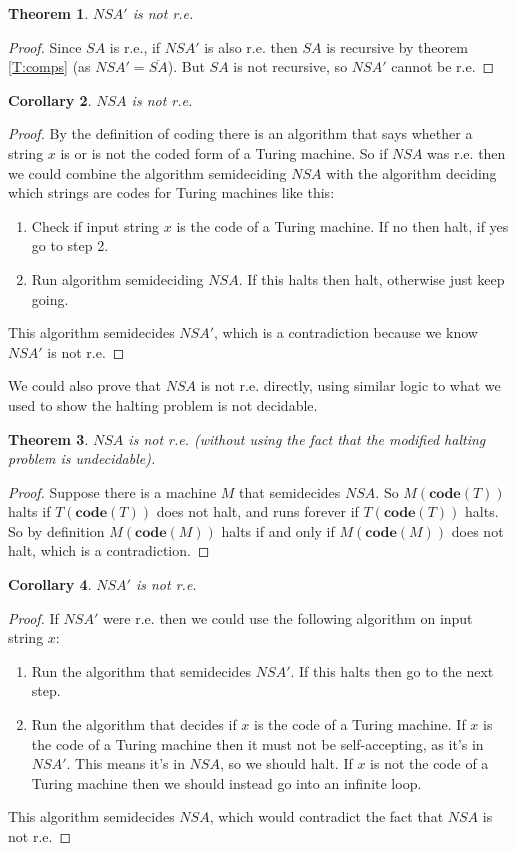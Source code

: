 \documentclass{article}
\theoremstyle{plain}
\newtheorem{theorem}{Theorem}[section]{\bfseries}{\itshape}
\newtheorem{corollary}[theorem]{Corollary}{\bfseries}{\upshape}
\theoremstyle{definition}
\newcommand{\co}{\mathbf{code}}
\begin{document}
\begin{theorem}
$NSA'$ is not r.e.
\end{theorem}
\begin{proof}
Since $SA$ is r.e., if $NSA'$ is also r.e. then $SA$ is recursive by theorem \ref{T:comps} (as $NSA'=\overline{SA}$). But $SA$ is not recursive, so $NSA'$ cannot be r.e.
\end{proof}

\begin{corollary}
$NSA$ is not r.e.
\end{corollary}
\begin{proof}
By the definition of coding there is an algorithm that says whether a string $x$ is or is not the coded form of a Turing machine. So if $NSA$ was r.e. then we could combine the algorithm semideciding $NSA$ with the algorithm deciding which strings are codes for Turing machines like this:
\begin{enumerate}
\item Check if input string $x$ is the code of a Turing machine. If no then halt, if yes go to step 2.
\item Run algorithm semideciding $NSA$. If this halts then halt, otherwise just keep going. 
\end{enumerate} 
This algorithm semidecides $NSA'$, which is a contradiction because we know $NSA'$ is not r.e.
\end{proof}

We could also prove that $NSA$ is not r.e. directly, using similar logic to what we used to show the halting problem is not decidable.

\begin{theorem}\label{T:NSAalt}
$NSA$ is not r.e. (without using the fact that the modified halting problem is undecidable).
\end{theorem}
\begin{proof}
Suppose there is a machine $M$ that semidecides $NSA$. So $M(\co(T))$ halts if $T(\co(T))$ does not halt, and runs forever if $T(\co(T))$ halts. So by definition $M(\co(M))$ halts if and only if $M(\co(M))$ does not halt, which is a contradiction.
\end{proof}

\begin{corollary}\label{C:NSA'}
$NSA'$ is not r.e.
\end{corollary}
\begin{proof}
If $NSA'$ were r.e. then we could use the following algorithm on input string $x$:
\begin{enumerate}
\item Run the algorithm that semidecides $NSA'$. If this halts then go to the next step.
\item Run the algorithm that decides if $x$ is the code of a Turing machine. If $x$ is the code of a Turing machine then it must not be self-accepting, as it's in $NSA'$. This means it's in $NSA$, so we should halt. If $x$ is not the code of a Turing machine then we should instead go into an infinite loop.   
\end{enumerate}
This algorithm semidecides $NSA$, which would contradict the fact that $NSA$ is not r.e. 
\end{proof}
\end{document}
